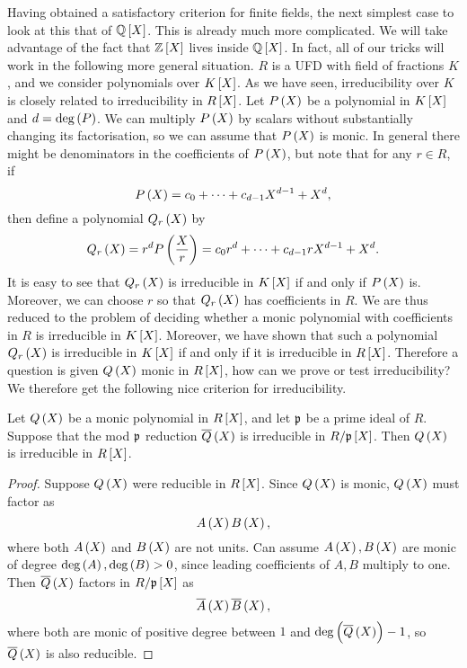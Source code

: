Having obtained a satisfactory criterion for finite fields, the next simplest case to look at this that of $ \Q\sbr{X} $. This is already much more complicated. We will take advantage of the fact that $ \Z\sbr{X} $ lives inside $ \Q\sbr{X} $. In fact, all of our tricks will work in the following more general situation. $ R $ is a UFD with field of fractions $ K $, and we consider polynomials over $ K\sbr{X} $. As we have seen, irreducibility over $ K $ is closely related to irreducibility in $ R\sbr{X} $. Let $ P\br{X} $ be a polynomial in $ K\sbr{X} $ and $ d = \deg\br{P} $. We can multiply $ P\br{X} $ by scalars without substantially changing its factorisation, so we can assume that $ P\br{X} $ is monic. In general there might be denominators in the coefficients of $ P\br{X} $, but note that for any $ r \in R $, if
$$ P\br{X} = c_0 + \dots + c_{d - 1}X^{d - 1} + X^d, $$
then define a polynomial $ Q_r\br{X} $ by
$$ Q_r\br{X} = r^dP\br{\dfrac{X}{r}} = c_0r^d + \dots + c_{d - 1}rX^{d - 1} + X^d. $$
It is easy to see that $ Q_r\br{X} $ is irreducible in $ K\sbr{X} $ if and only if $ P\br{X} $ is. Moreover, we can choose $ r $ so that $ Q_r\br{X} $ has coefficients in $ R $. We are thus reduced to the problem of deciding whether a monic polynomial with coefficients in $ R $ is irreducible in $ K\sbr{X} $. Moreover, we have shown that such a polynomial $ Q_r\br{X} $ is irreducible in $ K\sbr{X} $ if and only if it is irreducible in $ R\sbr{X} $. Therefore a question is given $ Q\br{X} $ monic in $ R\sbr{X} $, how can we prove or test irreducibility? We therefore get the following nice criterion for irreducibility.

\pagebreak

\begin{proposition}
Let $ Q\br{X} $ be a monic polynomial in $ R\sbr{X} $, and let $ \mathfrak{p} $ be a prime ideal of $ R $. Suppose that the mod $ \mathfrak{p} $ reduction $ \overline{Q}\br{X} $ is irreducible in $ R / \pp\sbr{X} $. Then $ Q\br{X} $ is irreducible in $ R\sbr{X} $.
\end{proposition}

\begin{proof}
Suppose $ Q\br{X} $ were reducible in $ R\sbr{X} $. Since $ Q\br{X} $ is monic, $ Q\br{X} $ must factor as
$$ A\br{X}B\br{X}, $$
where both $ A\br{X} $ and $ B\br{X} $ are not units. Can assume $ A\br{X}, B\br{X} $ are monic of degree $ \deg\br{A}, \deg\br{B} > 0 $, since leading coefficients of $ A, B $ multiply to one. Then $ \overline{Q}\br{X} $ factors in $ R / \pp\sbr{X} $ as
$$ \overline{A}\br{X}\overline{B}\br{X}, $$
where both are monic of positive degree between $ 1 $ and $ \deg\br{\overline{Q}\br{X}} - 1 $, so $ \overline{Q}\br{X} $ is also reducible.
\end{proof}

